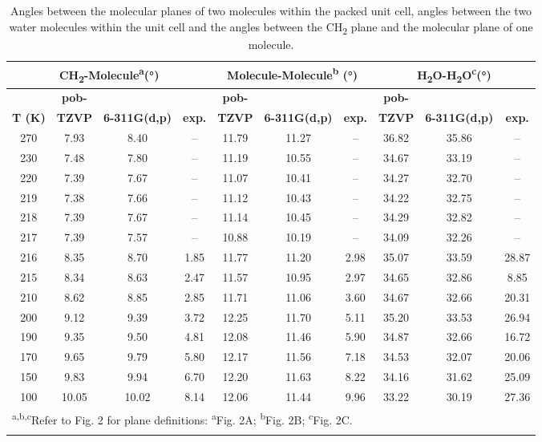 \begin{table}[htbp]
\centering
\tiny
\caption{Angles between the molecular planes of two molecules within the packed unit cell, angles between the two water molecules within the unit cell and the angles between the CH\textsubscript{2} plane and the molecular plane of one molecule.}
\begin{tabular}{cccccccccc}
\multicolumn{4}{c}{\textbf{CH\textsubscript{2}-Molecule\textsuperscript{a}(°)}} & \multicolumn{3}{c}{\textbf{Molecule-Molecule\textsuperscript{b} (°)}} & \multicolumn{3}{c}{\textbf{H\textsubscript{2}O-H\textsubscript{2}O\textsuperscript{c}(°)}} \\
\hline
& \textbf{pob-} & & & \textbf{pob-} & & & \textbf{pob-} \\
\textbf{T (K)} & \textbf{TZVP} & \textbf{6-311G(d,p)} & \textbf{exp.}  & \textbf{TZVP} & \textbf{6-311G(d,p)} & \textbf{exp.}  & \textbf{TZVP} & \textbf{6-311G(d,p)} & \textbf{exp.} \\
270 & 7.93 & 8.40 & --    &  11.79 & 11.27 & --     &  36.82 & 35.86 & -- \\
230 & 7.48 & 7.80 & --    &  11.19 & 10.55 & --     &  34.67 & 33.19 & -- \\
220 & 7.39 & 7.67 & --    &  11.07 & 10.41 & --     &  34.27 & 32.70 & -- \\
219 & 7.38 & 7.66 & --    &  11.12 & 10.43 & --     &  34.22 & 32.75 & -- \\
218 & 7.39 & 7.67 & --    &  11.14 & 10.45 & --     &  34.29 & 32.82 & -- \\
217 & 7.39 & 7.57 & --    &  10.88 & 10.19 & --     &  34.09 & 32.26 & -- \\
216 & 8.35 & 8.70 & 1.85  &  11.77 & 11.20 & 2.98   &  35.07 & 33.59 & 28.87 \\
215 & 8.34 & 8.63 & 2.47  &  11.57 & 10.95 & 2.97   &  34.65 & 32.86 & 8.85 \\
210 & 8.62 & 8.85 & 2.85  &  11.71 & 11.06 & 3.60   &  34.67 & 32.66 & 20.31 \\
200 & 9.12 & 9.39 & 3.72  &  12.25 & 11.70 & 5.11   &  35.20 & 33.53 & 26.94 \\
190 & 9.35 & 9.50 & 4.81  &  12.08 & 11.46 & 5.90   &  34.87 & 32.66 & 16.72 \\
170 & 9.65 & 9.79 & 5.80  &  12.17 & 11.56 & 7.18   &  34.53 & 32.07 & 20.06 \\
150 & 9.83 & 9.94 & 6.70  &  12.20 & 11.63 & 8.22   &  34.16 & 31.62 & 25.09 \\
100 & 10.05 & 10.02 & 8.14  & 12.06 & 11.44 & 9.96  & 33.22 & 30.19 & 27.36 \\
\hline
\multicolumn{10}{l}{\textsuperscript{a,b,c}Refer to Fig. 2 for plane definitions:  \textsuperscript{a}Fig. 2A; \textsuperscript{b}Fig. 2B; \textsuperscript{c}Fig. 2C.} \\
\label{btadh_angles_table}
\end{tabular}
\end{table}



